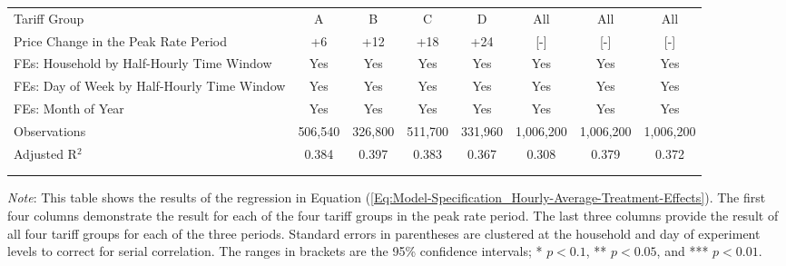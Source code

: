 \begin{sidewaystable}[h!]
\begin{adjustbox}{scale = 0.8}
\begin{threeparttable}
\begin{tabular}{@{\extracolsep{3pt}}lccccccc}
                    Tariff Group & A & B & C & D & All & All & All \\
                    Price Change in the Peak Rate Period & +6 & +12 & +18 & +24 & [-] & [-] & [-] \\
                    FEs: Household by Half-Hourly Time Window & Yes & Yes & Yes & Yes & Yes & Yes & Yes \\
                    FEs: Day of Week by Half-Hourly Time Window & Yes & Yes & Yes & Yes & Yes & Yes & Yes \\
                    FEs: Month of Year & Yes & Yes & Yes & Yes & Yes & Yes & Yes \\
                    Observations & 506,540 & 326,800 & 511,700 & 331,960 & 1,006,200 & 1,006,200 & 1,006,200 \\
                    Adjusted R$^{2}$ & 0.384 & 0.397 & 0.383 & 0.367 & 0.308 & 0.379 & 0.372 \\
                    \\[-2.0ex]
                    \hline \hline
                    \\[-4.5ex]
                \end{tabular}
                \begin{tablenotes}[flushleft]
                    \footnotesize
                    \item \textit{Note}: This table shows the results of the regression in Equation (\ref{Eq:Model-Specification_Hourly-Average-Treatment-Effects}). The first four columns demonstrate the result for each of the four tariff groups in the peak rate period. The last three columns provide the result of all four tariff groups for each of the three periods. Standard errors in parentheses are clustered at the household and day of experiment levels to correct for serial correlation. The ranges in brackets are the 95\% confidence intervals; * $p < 0.1$, ** $p < 0.05$, and *** $p < 0.01$.
                \end{tablenotes}
            \end{threeparttable}
        \end{adjustbox}
    \end{sidewaystable}
